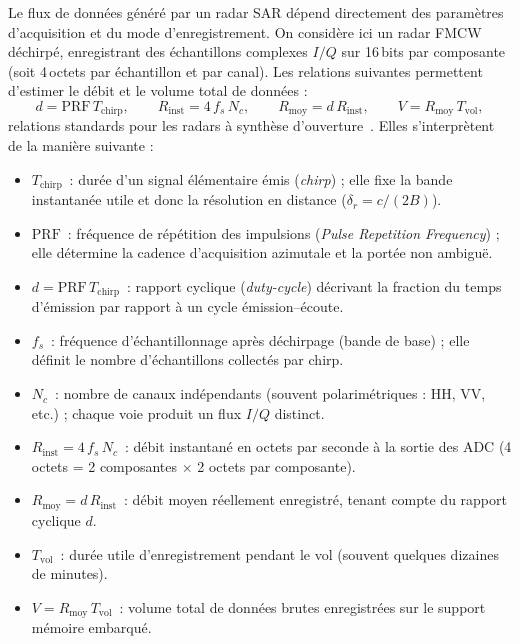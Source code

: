 Le flux de données généré par un radar SAR dépend directement des paramètres d’acquisition et du mode d’enregistrement.  
On considère ici un radar FMCW déchirpé, enregistrant des échantillons complexes $I/Q$ sur 16\,bits par composante (soit 4\,octets par échantillon et par canal).  
Les relations suivantes permettent d’estimer le débit et le volume total de données :
\[
d = \mathrm{PRF}\,T_{\mathrm{chirp}}, \qquad
R_{\mathrm{inst}} = 4\,f_s\,N_c, \qquad
R_{\mathrm{moy}} = d\,R_{\mathrm{inst}}, \qquad
V = R_{\mathrm{moy}}\,T_{\mathrm{vol}},
\]
relations standards pour les radars à synthèse d’ouverture~\cite{cumming2005,richards2010,Aguasca2013_ARBRES_UAV_SAR}.  
Elles s’interprètent de la manière suivante :
\begin{itemize}
  \item \textbf{$T_{\mathrm{chirp}}$}~: durée d’un signal élémentaire émis (\emph{chirp}) ; elle fixe la bande instantanée utile et donc la résolution en distance ($\delta_r = c / (2B)$).
  \item \textbf{$\mathrm{PRF}$}~: fréquence de répétition des impulsions (\emph{Pulse Repetition Frequency}) ; elle détermine la cadence d’acquisition azimutale et la portée non ambiguë.
  \item \textbf{$d = \mathrm{PRF}\,T_{\mathrm{chirp}}$}~: rapport cyclique (\emph{duty-cycle}) décrivant la fraction du temps d’émission par rapport à un cycle émission–écoute.
  \item \textbf{$f_s$}~: fréquence d’échantillonnage après déchirpage (bande de base) ; elle définit le nombre d’échantillons collectés par chirp.
  \item \textbf{$N_c$}~: nombre de canaux indépendants (souvent polarimétriques : HH, VV, etc.) ; chaque voie produit un flux $I/Q$ distinct.
  \item \textbf{$R_{\mathrm{inst}} = 4\,f_s\,N_c$}~: débit instantané en octets par seconde à la sortie des ADC (4 octets = 2 composantes $\times$ 2 octets par composante).
  \item \textbf{$R_{\mathrm{moy}} = d\,R_{\mathrm{inst}}$}~: débit moyen réellement enregistré, tenant compte du rapport cyclique $d$.
  \item \textbf{$T_{\mathrm{vol}}$}~: durée utile d’enregistrement pendant le vol (souvent quelques dizaines de minutes).
  \item \textbf{$V = R_{\mathrm{moy}}\,T_{\mathrm{vol}}$}~: volume total de données brutes enregistrées sur le support mémoire embarqué.
\end{itemize}

